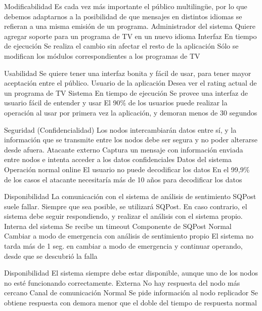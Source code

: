   \begin{enumerate}


\QA
{Modificabilidad} %
{Es cada vez más importante el público multilingüe, por lo que debemos adaptarnos a la posibilidad de que mensajes en distintos idiomas se refieran a una misma emisión de un programa.} %
{Administrador del sistema} %
{Quiere agregar soporte para un programa de TV en un nuevo idioma} %
{Interfaz} %
{En tiempo de ejecución} %
{Se realiza el cambio sin afectar el resto de la aplicación} %
{Sólo se modifican los módulos correspondientes a los programas de TV} %

\QA
{Usabilidad} %
{Se quiere tener una interfaz bonita y fácil de usar, para tener mayor aceptación entre el público.} %
{Usuario de la aplicación} %
{Desea ver el rating actual de un programa de TV} %
{Sistema} %
{En tiempo de ejecución} %
{Se provee una interfaz de usuario fácil de entender y usar} %
{El 90\% de los usuarios puede realizar la operación al usar por primera vez la aplicación, y demoran menos de 30 segundos} %

\QA
{Seguridad (Confidencialidad)} %
{Los nodos intercambiarán datos entre sí, y la información que se transmite entre los nodos debe ser segura y no poder alterarse desde afuera.} %
{Atacante externo} %
{Captura un mensaje con información enviada entre nodos e intenta acceder a los datos confidenciales} %
{Datos del sistema} %
{Operación normal online} %
{El usuario no puede decodificar los datos} %
{En el 99,9\% de los casos el atacante necesitaría más de 10 años para decodificar los datos} %

\QA
{Disponibilidad} %
{La comunicación con el sistema de análisis de sentimiento SQPost suele fallar. Siempre que sea posible, se utilizará SQPost. En caso contrario, el sistema debe seguir respondiendo, y realizar el análisis con el sistema propio.} %
{Interna del sistema} %
{Se recibe un timeout} %
{Componente de SQPost} %
{Normal} %
{Cambiar a modo de emergencia con análisis de sentimiento propio} %
{El sistema no tarda más de 1 seg. en cambiar a modo de emergencia y continuar operando, desde que se descubrió la falla} %

\QA
{Disponibilidad} %
{El sistema siempre debe estar disponible, aunque uno de los nodos no esté funcionando correctamente.} %
{Externa} %
{No hay respuesta del nodo más cercano} %
{Canal de comunicación} %
{Normal} %
{Se pide información al nodo replicador} %
{Se obtiene respuesta con demora menor que el doble del tiempo de respuesta normal} %


\end{enumerate}


